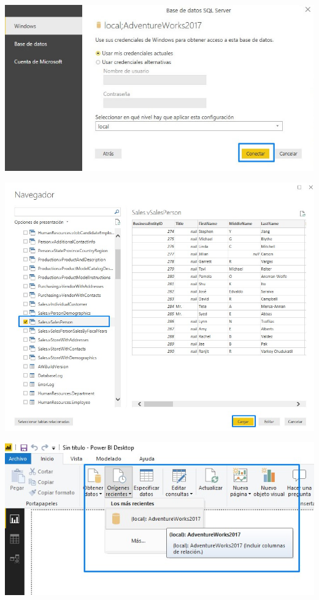 \begin{center}
\includegraphics[width=\columnwidth]{images/task1/task1-04}\newline
\end{center}

\begin{center}
\includegraphics[width=\columnwidth]{images/task1/task1-05}\newline
\end{center}

\begin{center}
\includegraphics[width=\columnwidth]{images/task1/task1-06}\newline
\end{center}


